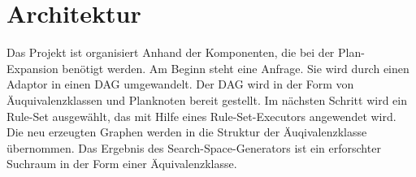 \section{Architektur}

Das Projekt ist organisiert Anhand der Komponenten, die bei der Plan-Expansion benötigt werden. Am Beginn steht eine Anfrage. Sie wird durch einen Adaptor in einen DAG umgewandelt. Der DAG wird in der Form von Äuquivalenzklassen und Planknoten bereit gestellt. Im nächsten Schritt wird ein Rule-Set ausgewählt, das mit Hilfe eines Rule-Set-Executors angewendet wird. Die neu erzeugten Graphen werden in die Struktur der Äuqivalenzklasse übernommen. Das Ergebnis des Search-Space-Generators ist ein erforschter Suchraum in der Form einer Äquivalenzklasse.